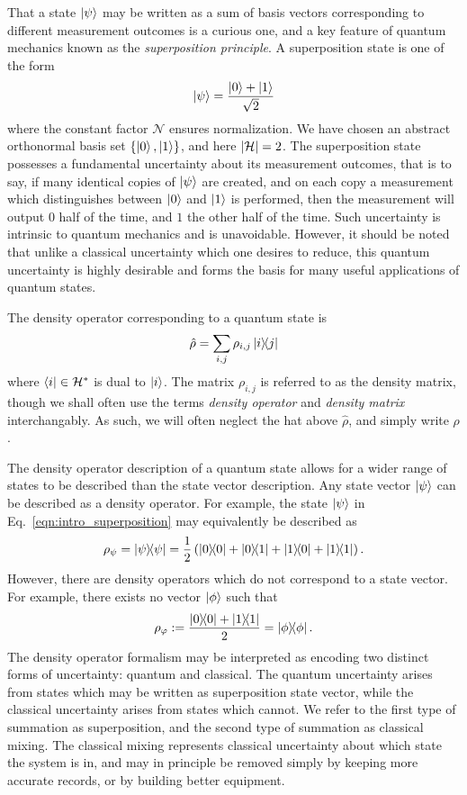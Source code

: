 That a state $\ket{\psi}$ may be written as a sum of basis vectors corresponding to different measurement outcomes is a curious one, and a key feature of quantum mechanics known as the \emph{superposition principle}. A superposition state is one of the form
\begin{equation}\label{eqn:intro_superposition}
\ket{\psi} = \frac{\ket{0} + \ket{1}}{\sqrt{2}}
\end{equation}
where the constant factor $\mathcal{N}$ ensures normalization. We have chosen an abstract orthonormal basis set $\left\{ \ket{0}, \ket{1}\right\}$, and here $\left|\mathcal{H}\right|=2$. The superposition state possesses a fundamental uncertainty about its measurement outcomes, that is to say, if many identical copies of $\ket{\psi}$ are created, and on each copy a measurement which distinguishes between $\ket{0}$ and $\ket{1}$ is performed, then the measurement will output $0$ half of the time, and $1$ the other half of the time. Such uncertainty is intrinsic to quantum mechanics and is unavoidable. However, it should be noted that unlike a classical uncertainty which one desires to reduce, this quantum uncertainty is highly desirable and forms the basis for many useful applications of quantum states.

The density operator corresponding to a quantum state is
\begin{equation}
\hat{\rho} = \sum_{i, j} \rho_{i, j} \dyad{i}{j}
\end{equation}
where $\bra{i} \in \mathcal{H}^*$ is dual to $\ket{i}$. The matrix $\rho_{i, j}$ is referred to as the density matrix, though we shall often use the terms \emph{density operator} and \emph{density matrix} interchangably. As such, we will often neglect the hat above $\hat{\rho}$, and simply write $\rho$.

The density operator description of a quantum state allows for a wider range of states to be described than the state vector description. Any state vector $\ket{\psi}$ can be described as a density operator. For example, the state $\ket{\psi}$ in Eq.~\ref{eqn:intro_superposition} may equivalently be described as 
\begin{equation}
\rho_\psi = \dyad{\psi}{\psi} = \frac{1}{2} \left(\dyad{0}{0} + \dyad{0}{1} + \dyad{1}{0} + \dyad{1}{1} \right).
\end{equation}
However, there are density operators which do not correspond to a state vector. For example, there exists no vector $\ket{\phi}$ such that
\begin{equation}
\rho_{\varphi} := \frac{\dyad{0}{0} + \dyad{1}{1}}{2} = \dyad{\phi}.
\end{equation}
The density operator formalism may be interpreted as encoding two distinct forms of uncertainty: quantum and classical. The quantum uncertainty arises from states which may be written as superposition state vector, while the classical uncertainty arises from states which cannot. We refer to the first type of summation as superposition, and the second type of summation as classical mixing. The classical mixing represents classical uncertainty about which state the system is in, and may in principle be removed simply by keeping more accurate records, or by building better equipment.

